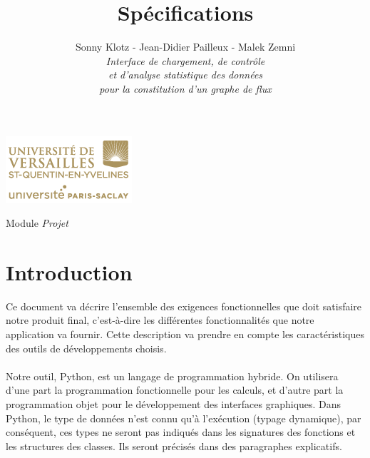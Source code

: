 

\title{\vspace{\fill}\textbf{\Huge Spécifications}}
\author{
	Sonny Klotz - Jean-Didier Pailleux - Malek Zemni
	\vspace{2em}\\
	\textit{Interface de chargement, de contrôle}\\\textit{et d’analyse statistique des données}\\\textit{pour la constitution d’un graphe de flux}
	\vspace{2em}
}


\clearpage
\maketitle\vspace{8em}
\begin{center}\includegraphics[scale=0.7]{../Cahier/logo.png}\end{center}
\begin{flushright}Module \textit{Projet}\end{flushright}
\newpage
\tableofcontents
\newpage\clearpage{}

	\section*{Introduction}
		Ce document va décrire l'ensemble des exigences fonctionnelles que doit satisfaire notre produit final, c'est-à-dire les différentes fonctionnalités que notre application va fournir. Cette description va prendre en compte les caractéristiques des outils de développements choisis.
		\paragraph{}Notre outil, Python, est un langage de programmation hybride. On utilisera d'une part la programmation fonctionnelle pour les calculs, et d'autre part la programmation objet pour le développement des interfaces graphiques. Dans Python, le type de données n'est connu qu'à l'exécution (typage dynamique), par conséquent, ces types ne seront pas indiqués dans les signatures des fonctions et les structures des classes. Ils seront précisés dans des paragraphes explicatifs.
